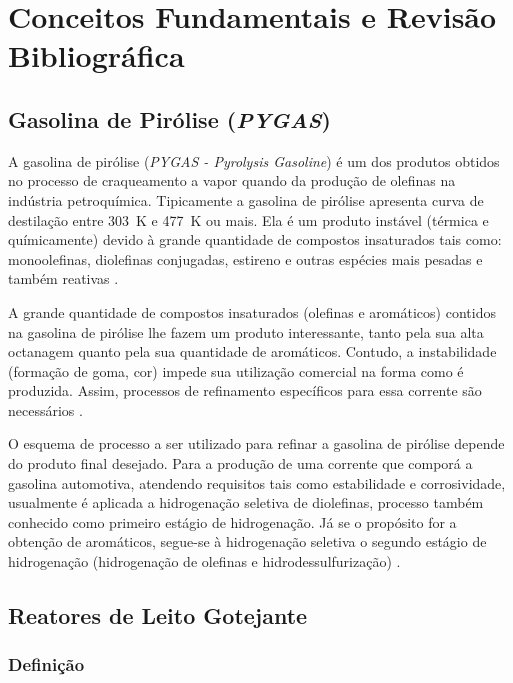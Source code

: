 %
\chapter{Conceitos Fundamentais e Revisão Bibliográfica}
\label{chap:revisaobibliografica}

\section{Gasolina de Pirólise (\emph{PYGAS})} \label{sec:pygas}
A gasolina de pirólise (\emph{PYGAS - Pyrolysis Gasoline}) é um dos produtos
obtidos no processo de craqueamento a vapor quando da produção de olefinas na
indústria petroquímica. Tipicamente a gasolina de pirólise apresenta curva de
destilação entre \SI{303}{K} e \SI{477}{K} ou mais. Ela é um produto instável
(térmica e químicamente) devido à grande quantidade de compostos insaturados tais como:
monoolefinas, diolefinas conjugadas, estireno e outras espécies mais pesadas e
também reativas \cite{Cheng1986}.
 
A grande quantidade de compostos insaturados (olefinas e aromáticos) contidos
na gasolina de pirólise lhe fazem um produto interessante, tanto pela
sua alta octanagem quanto pela sua quantidade de aromáticos. Contudo, a
instabilidade (formação de goma, cor) impede sua utilização comercial na forma
como é produzida. Assim, processos de refinamento específicos para essa corrente
são necessários \cite{Derrien1986}.

O esquema de processo a ser utilizado para refinar a gasolina de pirólise
depende do produto final desejado. Para a produção de uma corrente que
comporá a gasolina automotiva, atendendo requisitos tais como estabilidade e
corrosividade, usualmente é aplicada a hidrogenação seletiva de diolefinas,
processo também conhecido como primeiro estágio de hidrogenação. Já se o
propósito for a obtenção de aromáticos, segue-se à hidrogenação seletiva o
segundo estágio de hidrogenação (hidrogenação de olefinas e hidrodessulfurização)
\cite{Derrien1986}.

\section{Reatores de Leito Gotejante} \label{sec:reatorestbr}

\subsection{Definição} \label{sec:definicao}

